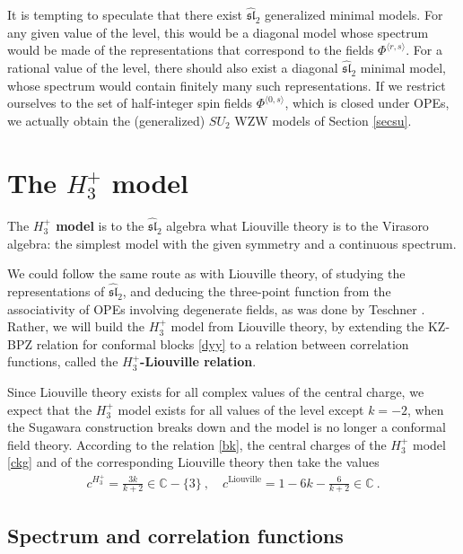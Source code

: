 \documentclass[12pt, a4paper, notitlepage, twoside]{report}
\numberwithin{equation}{section}
\theoremstyle{break}
\begin{document}
It is tempting to speculate that there exist $\widehat{\mathfrak{sl}}_2$ generalized minimal models.
For any given value of the level, this would be a diagonal model whose spectrum would be made of the representations that correspond to the fields $\Phi^{\langle r, s\rangle}$. For a rational value of the level, there should also exist a diagonal $\widehat{\mathfrak{sl}}_2$ minimal model, whose spectrum would contain finitely many such representations.
If we restrict ourselves to the set of half-integer spin fields $\Phi^{\langle 0, s\rangle}$, which is closed under OPEs, we actually obtain the (generalized) $SU_2$ WZW models of Section \ref{secsu}.


\section{The \texorpdfstring{$H_3^+$}{H3+} model\label{sechtp}}

The \textbf{\boldmath $H_3^+$ model} is to the $\widehat{\mathfrak{sl}}_2$ algebra what Liouville theory is to the Virasoro algebra: the simplest model with the given symmetry and a continuous spectrum. 

We could follow the same route as with Liouville theory, of studying the representations of $\widehat{\mathfrak{sl}}_2$, and deducing the three-point function from the associativity of OPEs involving degenerate fields, as was done by Teschner \cite{tes97a}.
Rather, we will build the $H_3^+$ model from Liouville theory, by extending the KZ-BPZ relation for conformal blocks \eqref{dyy} to a relation between correlation functions, called the \textbf{\boldmath $H_3^+$-Liouville relation}.

Since Liouville theory exists for all complex values of the central charge, we expect that the $H_3^+$ model exists for all values of the level except $k=-2$, when the Sugawara construction breaks down and the model is no longer a conformal field theory.
According to the relation \eqref{bk}, the central charges of the $H_3^+$ model \eqref{ckg} and of the corresponding Liouville theory then take the values
\begin{align}
 \boxed{c^{H_3^+} = \frac{3k}{k+2} \in \mathbb{C}-\{3\}} \ , \quad c^{\text{Liouville}} = 1-6k-\frac{6}{k+2}\in \mathbb{C}\ .
\end{align} 

\subsection{Spectrum and correlation functions}
\end{document}
